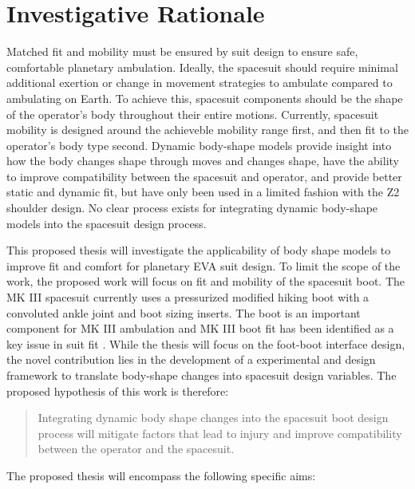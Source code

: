 \documentclass[defaultstyle,11pt]{comps}
\begin{document}
\hypertarget{investigative-rationale}{%
\chapter{Investigative Rationale}\label{investigative-rationale}}

Matched fit and mobility must be ensured by suit design to ensure safe, comfortable planetary ambulation.
Ideally, the spacesuit should require minimal additional exertion or change in movement strategies to ambulate compared to ambulating on Earth.
To achieve this, spacesuit components should be the shape of the operator's body throughout their entire motions.
Currently, spacesuit mobility is designed around the achieveble mobility range first, and then fit to the operator's body type second.
Dynamic body-shape models provide insight into how the body changes shape through moves and changes shape, have the ability to improve compatibility between the spacesuit and operator, and provide better static and dynamic fit, but have only been used in a limited fashion with the Z2 shoulder design.
No clear process exists for integrating dynamic body-shape models into the spacesuit design process.

This proposed thesis will investigate the applicability of body shape models to improve fit and comfort for planetary EVA suit design.
To limit the scope of the work, the proposed work will focus on fit and mobility of the spacesuit boot.
The MK III spacesuit currently uses a pressurized modified hiking boot with a convoluted ankle joint and boot sizing inserts.
The boot is an important component for MK III ambulation and MK III boot fit has been identified as a key issue in suit fit \citep{Fineman2018}.
While the thesis will focus on the foot-boot interface design, the novel contribution lies in the development of a experimental and design framework to translate body-shape changes into spacesuit design variables.
The proposed hypothesis of this work is therefore:

\begin{quote}
Integrating dynamic body shape changes into the spacesuit boot design process will mitigate factors that lead to injury and improve compatibility between the operator and the spacesuit.
\end{quote}

The proposed thesis will encompass the following specific aims:
\end{document}
